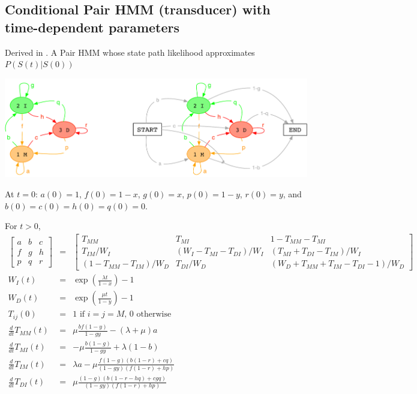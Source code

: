 \documentclass{article}
\begin{document}
\subsection{Conditional Pair HMM (transducer) with time-dependent parameters}
Derived in \cite{Holmes2020}.
A Pair HMM whose state path likelihood approximates $P(S(t)|S(0))$

\includegraphics[width=\textwidth]{PairHMM.pdf}

At $t=0$: $a(0)=1$, $f(0)=1-x$, $g(0)=x$, $p(0)=1-y$, $r(0)=y$, and $b(0)=c(0)=h(0)=q(0)=0$.

For $t>0$, %
\begin{eqnarray*}
\begin{bmatrix}
a & b & c \\
f & g & h \\
p & q & r 
\end{bmatrix}
& = &
\begin{bmatrix}
T_{MM} & T_{MI} & 1-T_{MM}-T_{MI} \\
T_{IM}/W_I & (W_I-T_{MI}-T_{DI})/W_I & (T_{MI}+T_{DI}-T_{IM})/W_I \\
(1-T_{MM}-T_{IM})/W_D & T_{DI}/W_D & (W_D+T_{MM}+T_{IM}-T_{DI}-1)/W_D 
\end{bmatrix}
\\
W_I(t) & = & \exp\left(\frac{\lambda t}{1-x}\right)-1 \\
W_D(t) & = & \exp\left(\frac{\mu t}{1-y}\right)-1 \\
T_{ij}(0) & = & \mbox{1 if $i=j=M$, 0 otherwise}
\\
  \frac{d}{dt} T_{MM}(t) & = &
  \mu \frac{b f (1-y)}{1 - g y}-(\lambda +\mu )a
  \nonumber \\
  \frac{d}{dt} T_{MI}(t) & = &
  -\mu \frac{b (1-g)}{1 - g y} + \lambda (1-b)
  \nonumber \\
  \frac{d}{dt} T_{IM}(t) & = &
  \lambda a - \mu \frac{f (1-g) (b (1-r)+c q)}{(1 - g y) (f (1-r)+h p)}
  \nonumber \\
  \frac{d}{dt} T_{DI}(t) & = &
  \mu \frac{(1-g) (b (1-r-h q)+c g q)}{(1-g y) (f (1-r)+h p)}
\end{eqnarray*}
\end{document}
